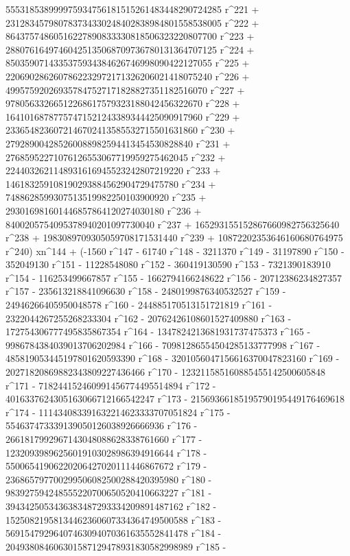        555318538999975934756181515261483448290724285 r^221 + 
       231283457980783734330248402838984801558538005 r^222 + 
       86437574860516227890833330818506323220807700 r^223 + 
       28807616497460425135068709736780131364707125 r^224 + 
       8503590714335375934384626746998090422127055 r^225 + 
       2206902862607862232972171326206021418075240 r^226 + 
       499575920269357847527171828827351182516070 r^227 + 
       97805633266512268617579323188042456322670 r^228 + 
       16410168787757471521243389344425090917960 r^229 + 
       2336548236072146702413585532715501631860 r^230 + 
       279289004285260088982594413454530828840 r^231 + 
       27685952271076126553067719959275462045 r^232 + 
       2244032621148931616945523242807219220 r^233 + 
       146183259108190293884562904729475780 r^234 + 
       7488628599307513519982250103900920 r^235 + 
       293016981601446857864120274030180 r^236 + 
       8400205754095378940201097730040 r^237 + 
       165293155152867660982756325640 r^238 + 
       1983089709305059708171531440 r^239 + 
       10872202353646160680764975 r^240) xn^144 + (-1560 r^147 - 
       61740 r^148 - 3211370 r^149 - 31197890 r^150 - 
       352049130 r^151 - 11228548080 r^152 - 360419130590 r^153 - 
       7321390183910 r^154 - 116253499667857 r^155 - 
       1662794166248622 r^156 - 20712386234827357 r^157 - 
       235613218841096630 r^158 - 2480199876340532527 r^159 - 
       24946266405950048578 r^160 - 244885170513151721819 r^161 - 
       2322044267255268233304 r^162 - 20762426108601527409880 r^163 - 
       172754306777495835867354 r^164 - 
       1347824213681931737475373 r^165 - 
       9986784384039013706202984 r^166 - 
       70981286554504285133777998 r^167 - 
       485819053445197801620593390 r^168 - 
       3201056047156616370047823160 r^169 - 
       20271820869882343809227436466 r^170 - 
       123211585160885455142500605848 r^171 - 
       718244152460991456774495514894 r^172 - 
       4016337624305163066712166542247 r^173 - 
       21569366185195790195449176469618 r^174 - 
       111434083391632214623333707051824 r^175 - 
       554637473339139050126038926666936 r^176 - 
       2661817992967143048088628338761660 r^177 - 
       12320939896256019103028986394916644 r^178 - 
       55006541906220206427020111446867672 r^179 - 
       236865797700299506082500288420395980 r^180 - 
       983927594248555220700650520410663227 r^181 - 
       3943425053436383487293334209891487162 r^182 - 
       15250821958134462360607334364749500588 r^183 - 
       56915479296407463094070361635552841478 r^184 - 
       204938084606301587129478931830582998989 r^185 - 
